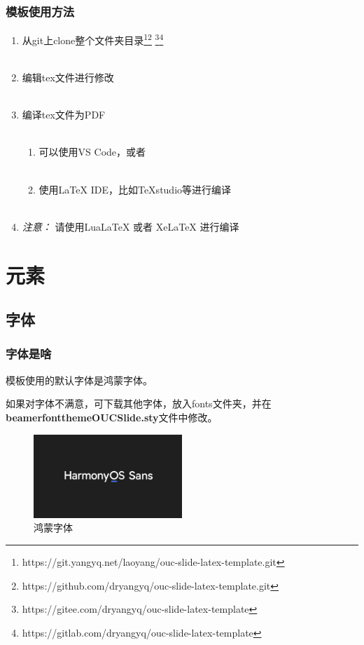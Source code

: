 \documentclass[aspectratio=169,UTF8,t]{beamer}%
\begin{document}
\begin{frame}
    \frametitle{模板使用方法}    
    \begin{enumerate}
        \item 从git上clone整个文件夹目录\footnote{https://git.yangyq.net/laoyang/ouc-slide-latex-template.git }\footnote{https://github.com/dryangyq/ouc-slide-latex-template.git} \footnote{https://gitee.com/dryangyq/ouc-slide-latex-template}\footnote{https://gitlab.com/dryangyq/ouc-slide-latex-template}\\~
        \item 编辑tex文件进行修改\\~
        \item 编译tex文件为PDF\\~
        \begin{enumerate}
            \item 可以使用VS Code，或者\\~
            \item 使用LaTeX IDE，比如TeXstudio等进行编译\\~
        \end{enumerate}
        \item \emph{注意：} 请使用LuaLaTeX 或者 XeLaTeX 进行编译
    \end{enumerate}
\end{frame}

\section{元素}

\subsection{字体}

\begin{frame}
    \frametitle{字体是啥}
    模板使用的默认字体是鸿蒙字体。

    如果对字体不满意，可下载其他字体，放入fonts文件夹，并在\textbf{beamerfontthemeOUCSlide.sty}文件中修改。
    \begin{center}
        \begin{figure}
        \centering
        \includegraphics[width=0.5\textwidth]{figs/harmonysans.png}
            \caption{鸿蒙字体}
            \label{fig:harmonysans}
        \end{figure}
    \end{center}
\end{frame}
\end{document}
